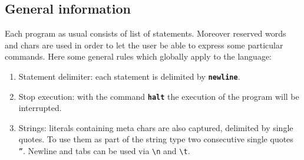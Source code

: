 \documentclass[12pt]{article}
\begin{document}
\subsection{General information}
Each program as usual consists of list of statements. Moreover reserved words and chars are used in order to let the user be able to express some particular commands. Here some general rules which globally apply to the language:
\begin{enumerate}
\item Statement delimiter: each statement is delimited by \texttt{\textbf{newline}}.
\item Stop execution: with the command \texttt{\textbf{halt}} the execution of the program will be interrupted.
\item Strings: literals containing meta chars are also captured, delimited by single quotes. To use them as part of the string type two consecutive single quotes \texttt{''}. Newline and tabs can be used via \texttt{\textbackslash n} and \texttt{\textbackslash t}.
\end{enumerate}
\vspace{1cm}
\end{document}

